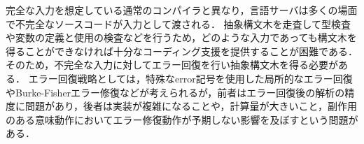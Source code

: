 \documentclass[fontsize=9bp,twocolumn,column_gap=2.36zw,a4paper,report]{jlreq}
\begin{document}
完全な入力を想定している通常のコンパイラと異なり，言語サーバは多くの場面で不完全なソースコードが入力として渡される．
抽象構文木を走査して型検査や変数の定義と使用の検査などを行うため，どのような入力であっても構文木を得ることができなければ十分なコーディング支援を提供することが困難である．
そのため，不完全な入力に対してエラー回復を行い抽象構文木を得る必要がある．
エラー回復戦略としては，特殊なerror記号を使用した局所的なエラー回復やBurke-Fisherエラー修復などが考えられるが，前者はエラー回復後の解析の精度に問題があり，後者は実装が複雑になることや，計算量が大きいこと，副作用のある意味動作においてエラー修復動作が予期しない影響を及ぼすという問題がある．

\begin{figure}[h]
\end{figure}


\begin{figure}[h]
\end{figure}
\end{document}
